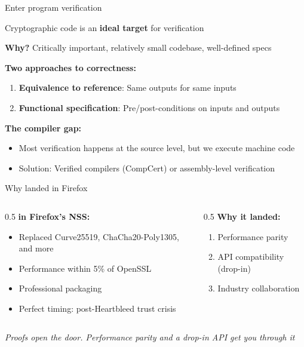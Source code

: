 \ifdefined\PRESENTATION\else\PassOptionsToClass{handout}{beamer}\fi\documentclass[aspectratio=169, lualatex]{beamer}
\begin{document}
\begin{frame}{Enter program verification}
	\begin{center}
		\Large
		Cryptographic code is an \textbf{ideal target} for verification
	\end{center}
	\vspace{0.5em}
	\textbf{Why?} Critically important, relatively small codebase, well-defined specs
	\vspace{0.5em}

	\textbf{Two approaches to correctness:}
	\begin{enumerate}
		\item \textbf{Equivalence to reference}: Same outputs for same inputs
		\item \textbf{Functional specification}: Pre/post-conditions on inputs and outputs
	\end{enumerate}
	\vspace{0.5em}
	\textbf{The compiler gap:}
	\begin{itemize}
		\item Most verification happens at the source level, but we execute machine code
		\item Solution: Verified compilers (CompCert) or assembly-level verification
	\end{itemize}
\end{frame}

\begin{frame}{Why \haclstar landed in Firefox}
	\begin{columns}[c]
		\begin{column}{0.5\textwidth}
			\textbf{\haclstar in Firefox's NSS:}
			\begin{itemize}
				\item Replaced Curve25519, ChaCha20-Poly1305, and more
				\item Performance within 5\% of OpenSSL
				\item Professional packaging
				\item Perfect timing: post-Heartbleed trust crisis
			\end{itemize}
		\end{column}
		\begin{column}{0.5\textwidth}
			\textbf{Why it landed:}
			\begin{enumerate}
				\item Performance parity
				\item API compatibility (drop-in)
				\item Industry collaboration
			\end{enumerate}
		\end{column}
	\end{columns}
	\vspace{0.5em}
	\begin{center}
		\textit{Proofs open the door. Performance parity and a drop-in API get you through it}
	\end{center}
\end{frame}
\end{document}

